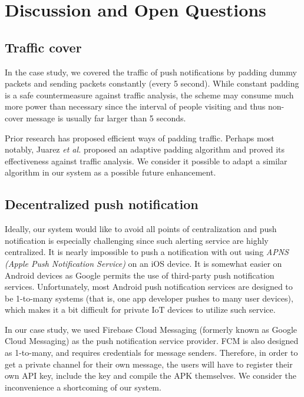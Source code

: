 \chapter{Discussion and Open Questions}

\section{Traffic cover}
\label{sec:traffic_cover}
In the case study, we covered the traffic of push notifications by padding dummy packets and sending packets constantly (every 5 second). While constant padding is  a safe countermeasure against traffic analysis, the scheme may consume much more power than necessary since the interval of people visiting and thus non-cover message is usually far larger than 5 seconds. 

Prior research has proposed efficient ways of padding traffic. Perhaps most notably, Juarez \textit{et al.} \cite{juarez2016toward} proposed an adaptive padding algorithm and proved its effectiveness against traffic analysis. We consider it possible to adapt a similar algorithm in our system as a possible future enhancement.

\section{Decentralized push notification}
\label{sec:decentralized_push}
Ideally, our system would like to avoid all points of centralization and push notification is especially challenging since such alerting service are highly centralized. It is nearly impossible to push a notification with out using \textit{APNS (Apple Push Notification Service)} on an iOS device. It is somewhat easier on Android devices as Google permits the use of third-party push notification services. Unfortunately, most Android push notification services are designed to be 1-to-many systems (that is, one app developer pushes to many user devices), which makes it a bit difficult for private IoT devices to utilize such service.

In our case study, we used Firebase Cloud Messaging (formerly known as Google Cloud Messaging) as the push notification service provider. FCM is also designed as 1-to-many, and requires credentials for message senders. Therefore, in order to get a private channel for their own message, the users will have to register their own API key, include the key and compile the APK themselves. We consider the inconvenience a shortcoming of our system.

